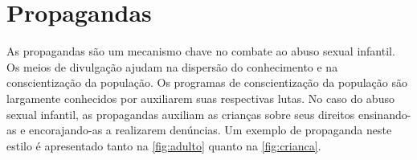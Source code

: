 


\section{Propagandas}\label{sec:propagandas}

As propagandas são um mecanismo chave no combate ao abuso sexual infantil. Os meios de divulgação ajudam na dispersão do conhecimento e na conscientização da população. Os programas de conscientização da população são largamente conhecidos por auxiliarem suas respectivas lutas. %
No caso do abuso sexual infantil, as propagandas auxiliam as crianças sobre seus direitos ensinando-as e encorajando-as a realizarem denúncias. Um exemplo de propaganda neste estilo é apresentado tanto na \autoref{fig:adulto} quanto na \autoref{fig:crianca}.

